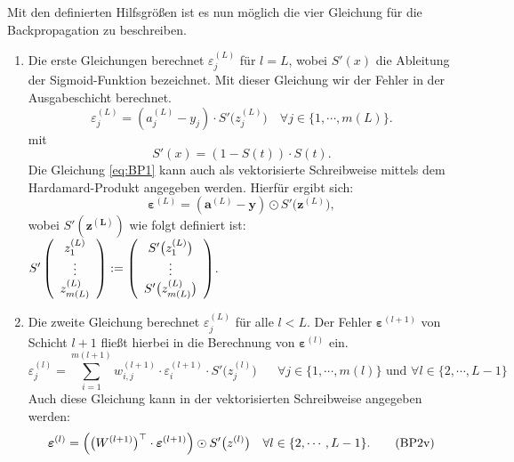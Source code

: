 \noindent
Mit den definierten Hilfsgrößen ist es nun möglich die vier Gleichung für die Backpropagation zu beschreiben. 
 
\begin{enumerate}
\item Die erste Gleichungen berechnet $\varepsilon^{(L)}_j$ für $l=L$, wobei $S'(x)$ die Ableitung der Sigmoid-Funktion bezeichnet. Mit dieser Gleichung wir der Fehler in der Ausgabeschicht berechnet.
\begin{equation}
	\label{eq:BP1}
	\varepsilon^{(L)}_j = (a_j^{(L)} - y_j) \cdot S'\bigl(z_j^{(L)}\bigr)
	\quad \mbox{$\forall j \in \{1, \cdots, m(L)\}$}. \tag{BP1}
\end{equation}
mit
\begin{equation}
	\label{eq:sigmoidPrime}
	S'(x) = (1-S(t)) \cdot S(t).
\end{equation}
Die Gleichung \ref{eq:BP1} kann auch als vektorisierte Schreibweise mittels dem Hardamard-Produkt angegeben werden. Hierfür ergibt sich:
\begin{equation}
  \label{eq:BP1s}
\boldsymbol{\varepsilon}^{(L)} = (\mathbf{a}^{(L)} - \mathbf{y}) \odot S'\bigl(\mathbf{z}^{(L)}\bigr),  \tag{BP1v}
\end{equation}
wobei $S'(\mathbf{z^{(L)}})$ wie folgt definiert ist:
\\[0.2cm]
\hspace*{1.3cm}
$ S'\left(
  \begin{array}[c]{c}
   z_1^{(L)}      \\
   \vdots       \\
   z_{m(L)}^{(L)} 
  \end{array}
  \right) := \left(
  \begin{array}[c]{c}
   S'\bigl(z_1^{(L)}\bigr)      \\
   \vdots       \\
   S'\bigl(z_{m(L)}^{(L)}\bigr)
  \end{array}
  \right)
$.
\\[0.2cm]
    
\item Die zweite Gleichung berechnet $\varepsilon^{(L)}_j$ für alle $l<L$. Der Fehler $\boldsymbol{\varepsilon}^{(l+1)}$ von Schicht $l+1$ fließt hierbei in die Berechnung von $\boldsymbol{\varepsilon}^{(l)}$ ein.
\begin{equation}
	\label{eq:BP2}
	\varepsilon^{(l)}_j = \sum\limits_{i=1}^{m(l+1)} w_{i,j}^{(l+1)} \cdot 			\varepsilon^{(l+1)}_i \cdot S'\bigl(z^{(l)}_j\bigr) \quad \mbox{ $\forall j \in \{1, \cdots, m(l)\}$ und $\forall l \in \{2, \cdots, L-1\}$} \tag{BP2}
\end{equation}
Auch diese Gleichung kann in der vektorisierten Schreibweise angegeben werden:
\begin{equation}
  \label{eq:BP2v}
  \boldsymbol{\varepsilon}^{(l)} = \Bigl(\bigl(W^{(l+1)}\bigr)^\top \cdot \boldsymbol{\varepsilon}^{(l+1)}\Bigr) \odot
  S'\bigl(z^{(l)}\bigr) \quad \mbox{$\forall l \in \{2, \cdots, L-1\}$}. \tag{BP2v}
\end{equation}


\end{enumerate}
